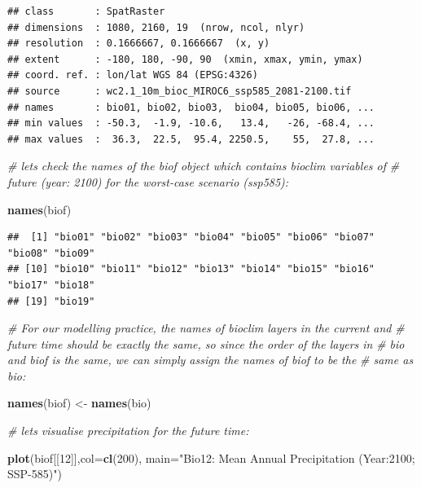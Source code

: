 \documentclass[
]{article}
\newenvironment{Shaded}{\begin{snugshade}}{\end{snugshade}}
\newcommand{\AttributeTok}[1]{\textcolor[rgb]{0.13,0.29,0.53}{#1}}
\newcommand{\CommentTok}[1]{\textcolor[rgb]{0.56,0.35,0.01}{\textit{#1}}}
\newcommand{\DecValTok}[1]{\textcolor[rgb]{0.00,0.00,0.81}{#1}}
\newcommand{\FunctionTok}[1]{\textcolor[rgb]{0.13,0.29,0.53}{\textbf{#1}}}
\newcommand{\NormalTok}[1]{#1}
\newcommand{\OtherTok}[1]{\textcolor[rgb]{0.56,0.35,0.01}{#1}}
\newcommand{\StringTok}[1]{\textcolor[rgb]{0.31,0.60,0.02}{#1}}
\begin{document}
\begin{verbatim}
## class       : SpatRaster 
## dimensions  : 1080, 2160, 19  (nrow, ncol, nlyr)
## resolution  : 0.1666667, 0.1666667  (x, y)
## extent      : -180, 180, -90, 90  (xmin, xmax, ymin, ymax)
## coord. ref. : lon/lat WGS 84 (EPSG:4326) 
## source      : wc2.1_10m_bioc_MIROC6_ssp585_2081-2100.tif 
## names       : bio01, bio02, bio03,  bio04, bio05, bio06, ... 
## min values  : -50.3,  -1.9, -10.6,   13.4,   -26, -68.4, ... 
## max values  :  36.3,  22.5,  95.4, 2250.5,    55,  27.8, ...
\end{verbatim}

\begin{Shaded}
\begin{Highlighting}[]
\CommentTok{\# let\textquotesingle{}s check the names of the biof object which contains bioclim variables of}
\CommentTok{\# future (year: 2100) for the worst{-}case scenario (ssp585):}

\FunctionTok{names}\NormalTok{(biof) }
\end{Highlighting}
\end{Shaded}

\begin{verbatim}
##  [1] "bio01" "bio02" "bio03" "bio04" "bio05" "bio06" "bio07" "bio08" "bio09"
## [10] "bio10" "bio11" "bio12" "bio13" "bio14" "bio15" "bio16" "bio17" "bio18"
## [19] "bio19"
\end{verbatim}

\begin{Shaded}
\begin{Highlighting}[]
\CommentTok{\# For our modelling practice, the names of bioclim layers in the current and }
\CommentTok{\# future time should be exactly the same, so since the order of the layers in }
\CommentTok{\# bio and biof is the same, we can simply assign the names of biof to be the }
\CommentTok{\# same as bio:}

\FunctionTok{names}\NormalTok{(biof) }\OtherTok{\textless{}{-}} \FunctionTok{names}\NormalTok{(bio)}


\CommentTok{\# let\textquotesingle{}s visualise precipitation for the future time:}

\FunctionTok{plot}\NormalTok{(biof[[}\DecValTok{12}\NormalTok{]],}\AttributeTok{col=}\FunctionTok{cl}\NormalTok{(}\DecValTok{200}\NormalTok{), }
     \AttributeTok{main=}\StringTok{"Bio12: Mean Annual Precipitation (Year:2100; SSP{-}585)"}\NormalTok{)}
\end{Highlighting}
\end{Shaded}
\end{document}
